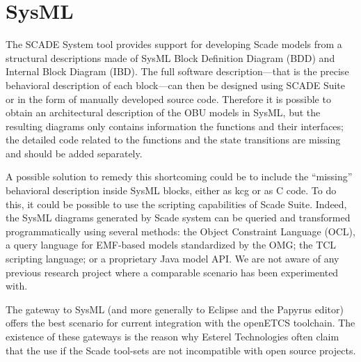 \documentclass{template/openetcs_report}
\begin{document}
\section{SysML}
\label{sec:sysml}

The SCADE System tool provides support for developing Scade models
from a structural descriptions made of SysML Block Definition Diagram
(BDD) and Internal Block Diagram (IBD).  The full software
description---that is the precise behavioral description of each
block---can then be designed using SCADE Suite or in the form of
manually developed source code. Therefore it is possible to obtain an
architectural description of the OBU models in SysML, but the
resulting diagrams only contains information the functions and their
interfaces; the detailed code related to the functions and the state
transitions are missing and should be added separately.

A possible solution to remedy this shortcoming could be to include the
``missing'' behavioral description inside SysML blocks, either as kcg
or as C code. To do this, it could be possible to use the scripting
capabilities of Scade Suite. Indeed, the SysML diagrams generated by
Scade system can be queried and transformed programmatically using
several methods: the Object Constraint Language (OCL), a query
language for EMF-based models standardized by the OMG; the TCL
scripting language; or a proprietary Java model API. We are not aware
of any previous research project where a comparable scenario has been
experimented with.

The gateway to SysML (and more generally to Eclipse and the Papyrus
editor) offers the best scenario for current integration with the
openETCS toolchain. The existence of these gateways is the reason why
Esterel Technologies often claim that the use if the Scade tool-sets
are not incompatible with open source projects.

\begin{center}
  \setlength{\fboxsep}{10pt}
\end{center}
\end{document}
